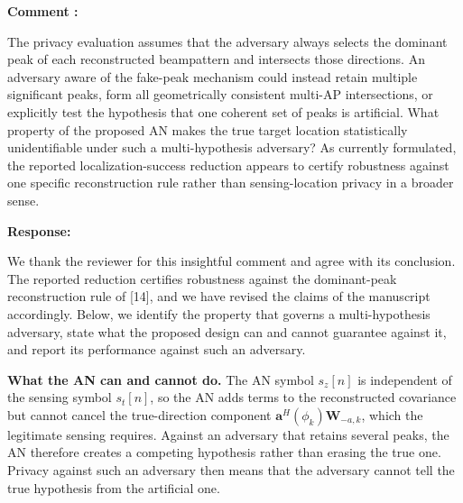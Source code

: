 \documentclass[a4paper,12pt]{article}
\newcounter{reviewcomment}
\newenvironment{reviewcomment}{%
  \stepcounter{reviewcomment}%
  \begin{shaded}
  \textbf{Comment \thereviewcomment:}\par
}{\end{shaded}}
\newenvironment{response}{\par\textbf{Response:}\par}{\par}
\begin{document}
\begin{reviewcomment}
The privacy evaluation assumes that the adversary always selects the dominant
peak of each reconstructed beampattern and intersects those directions. An
adversary aware of the fake-peak mechanism could instead retain multiple
significant peaks, form all geometrically consistent multi-AP intersections,
or explicitly test the hypothesis that one coherent set of peaks is
artificial. What property of the proposed AN makes the true target location
statistically unidentifiable under such a multi-hypothesis adversary? As
currently formulated, the reported localization-success reduction appears to
certify robustness against one specific reconstruction rule rather than
sensing-location privacy in a broader sense.
\end{reviewcomment}
\begin{response}
We thank the reviewer for this insightful comment and agree with its
conclusion. The reported reduction certifies robustness against the
dominant-peak reconstruction rule of [14], and we have revised the claims of
the manuscript accordingly. Below, we identify the property that governs a
multi-hypothesis adversary, state what the proposed design can and cannot
guarantee against it, and report its performance against such an adversary.

\textbf{What the AN can and cannot do.} The AN symbol $s_z[n]$ is
independent of the sensing symbol $s_t[n]$, so the AN adds terms to the
reconstructed covariance but cannot cancel the true-direction component
$\mathbf{a}^H(\phi_k)\mathbf{W}_{-a,k}$, which the legitimate sensing
requires. Against an adversary that retains several peaks, the AN
therefore creates a competing hypothesis rather than erasing the true one.
Privacy against such an adversary then means that the adversary cannot tell
the true hypothesis from the artificial one.


\end{response}
\end{document}
